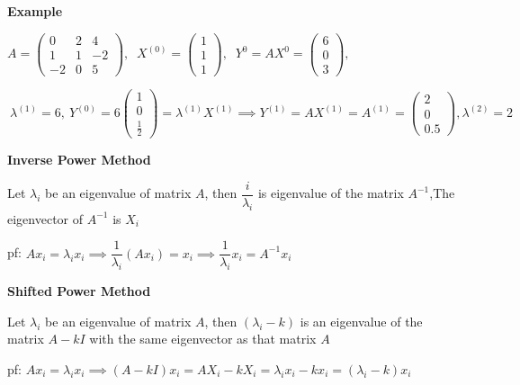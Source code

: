 \textbf{Example}

\begin{tcolorbox}
	$A = \left( \begin{matrix}
		0&2&4\\1&1&-2\\-2&0&5
	\end{matrix}\right),$
	$~X^{(0)} = \left(\begin{matrix}
		1\\1\\1
	\end{matrix}\right),$
	$~Y^{0} = AX^{0} = \left(\begin{matrix}
		6\\0\\3
	\end{matrix}\right),$
	
	
	$~\lambda^{(1)} = 6,~ Y^{(0)} = 6\left(\begin{matrix}
		1\\0\\\frac{1}{2}
	\end{matrix}\right) = \lambda^{(1)}X^{(1)} \implies Y^{(1)} = AX^{(1)} = A^{(1)} = \left(\begin{matrix}
		2\\0\\0.5
	\end{matrix}\right), \lambda^{(2)} = 2$
\end{tcolorbox}

\textbf{Inverse Power Method}

\begin{tcolorbox}
	Let $\lambda_i$ be an eigenvalue of matrix $A$, then $\dfrac{i}{\lambda_i}$ is eigenvalue of the matrix $A^{-1}$,The eigenvector of $A^{-1}$ is $X_i$
	
	pf: $Ax_i = \lambda_ix_i \implies \dfrac{1}{\lambda_i}\left( Ax_i \right) = x_i \implies \dfrac{1}{\lambda_i}x_i = A^{-1}x_i$
\end{tcolorbox}

\textbf{Shifted Power Method}

\begin{tcolorbox}
	Let $\lambda_i$ be an eigenvalue of matrix $A$, then $(\lambda_i - k)$ is an eigenvalue of the matrix $A-kI$ with the same eigenvector as that matrix $A$
	
	pf: $Ax_i = \lambda_ix_i \implies (A-kI)x_i = AX_i - kX_i = \lambda_ix_i - kx_i = (\lambda_i - k)x_i$
\end{tcolorbox}

































